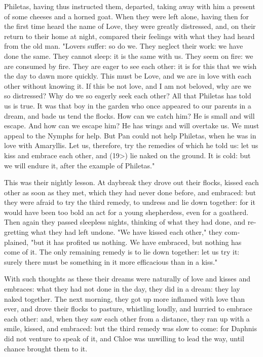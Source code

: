 \documentclass{book}
\begin{document}
\begin{pairs}
\begin{Rightside}
\begin{english}
  Philetas, having thus instructed them, departed, taking away with him a present of some cheeses and a horned goat.  When they were left alone, having then for the first time heard the name of Love, they were greatly distressed, and, on their return to their home at night, compared their feelings with what they had heard from the old man.  "Lovers suffer: so do we. They neglect their work: we have done the same.  They cannot sleep: it is the same with us.  They seem on fire: we are consumed by fire.  They are eager to see each other: it is for this that we wish the day to dawn more quickly.  This must be Love, and we are in love with each other without knowing it. If this be not love, and I am not beloved, why are we so distressed?  Why do we so eagerly seek each other?  All that Philetas has told us is true.  It was that boy in the garden who once appeared to our parents in a dream, and bade us tend the flocks.  How can we catch him?  He is small and will escape.  And how can we escape him?  He has wings and will overtake us.  We must appeal to the Nymphs for help.  But Pan could not help Philetas, when he was in love with Amaryllis.  Let us, therefore, try the remedies of which he told us: let us kiss and embrace each other, and (19>) lie naked on the ground.  It is cold: but we will endure it, after the example of Philetas."
\pend


  This was their nightly lesson.  At daybreak they drove out their flocks, kissed each other as soon as they met, which they had never done before, and embraced: but they were afraid to try the third remedy, to undress and lie down together: for it would have been too bold an act for a young shepherdess, even for a goatherd.  Then again they passed sleepless nights, thinking of what they had done, and regretting what they had left undone.  "We have kissed each other," they complained, "but it has profited us nothing.  We have embraced, but nothing has come of it.  The only remaining remedy is to lie down together: let us try it: surely there must be something in it more efficacious than in a kiss."
\pend


  With such thoughts as these their dreams were naturally of love and kisses and embraces: what they had not done in the day, they did in a dream: they lay naked together.  The next morning, they got up more inflamed with love than ever, and drove their flocks to pasture, whistling loudly, and hurried to embrace each other: and, when they saw each other from a distance, they ran up with a smile, kissed, and embraced: but the third remedy was slow to come: for Daphnis did not venture to speak of it, and Chloe was unwilling to lead the way, until chance brought them to it.
\pend



\end{english}
\end{Rightside}
\end{pairs}
\end{document}
